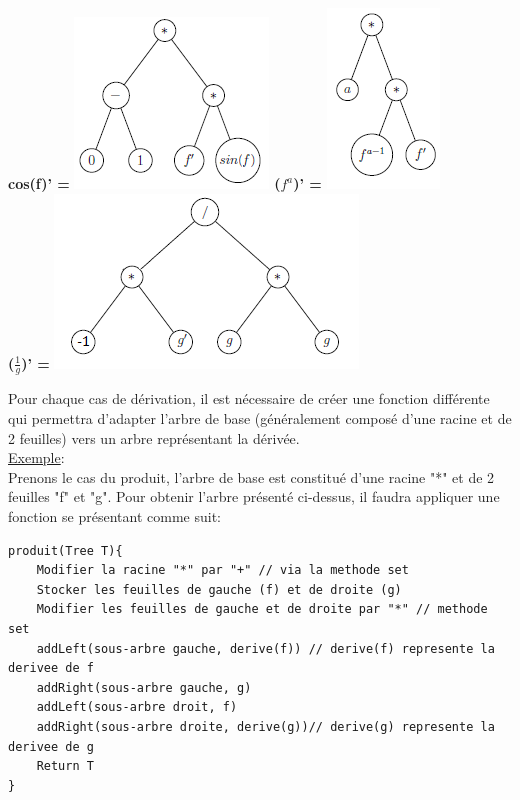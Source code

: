 \documentclass[10pt,a4paper]{article}
\begin{document}
\textbf{cos(f)' =} \includegraphics[scale=1]{q9-cosf.png}
\textbf{($f^{a}$)' =} \includegraphics[scale=1]{q9-fa.png}\\
\textbf{($\frac{1}{g}$)' =} \includegraphics[scale=1]{q9-1divg.png} 

Pour chaque cas de dérivation, il est nécessaire de créer une fonction différente qui permettra d'adapter l'arbre de base (généralement composé d'une racine et de 2 feuilles) vers un arbre représentant la dérivée.\\

\underline{Exemple}:\\

Prenons le cas du produit, l'arbre de base est constitué d'une racine "*" et de 2 feuilles "f" et "g". Pour obtenir l'arbre présenté ci-dessus, il faudra appliquer une fonction se présentant comme suit:

\begin{lstlisting}
produit(Tree T){
    Modifier la racine "*" par "+" // via la methode set
	Stocker les feuilles de gauche (f) et de droite (g)
	Modifier les feuilles de gauche et de droite par "*" // methode set
	addLeft(sous-arbre gauche, derive(f)) // derive(f) represente la derivee de f
	addRight(sous-arbre gauche, g)
	addLeft(sous-arbre droit, f)
	addRight(sous-arbre droite, derive(g))// derive(g) represente la derivee de g
	Return T 
}
\end{lstlisting}
\end{document}
